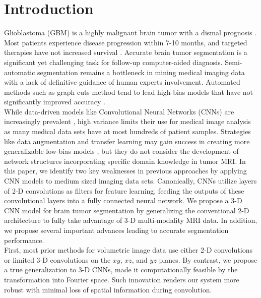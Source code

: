 \documentclass{llncs}
\begin{document}

\section{Introduction}
Glioblastoma (GBM) is a highly malignant brain tumor with a dismal prognosis \cite{Adamson09}. Most patients experience disease progression within 7-10 months, and targeted therapies have not increased survival \cite{Omuro13,Omuro07}. Accurate brain tumor segmentation is a significant yet challenging task for follow-up computer-aided diagnosis. Semi-automatic segmentation remains a bottleneck in mining medical imaging data with a lack of definitive guidance of human experts involvement. Automated methods such as graph cuts method tend to lead high-bias models that have not significantly improved accuracy \cite{Njeh15}. \\
\indent While data-driven models like Convolutional Neural Networks (CNNs) are increasingly prevalent \cite{Deng09,Krizhevsky12,Lawrence97,Wei}, high variance limits their use for medical image analysis as many medical data sets have at most hundreds of patient samples. Strategies like data augmentation and transfer learning may gain success in creating more generalizable low-bias models \cite{Cui14,Yosinski14}, but they do not consider the development of network structures incorporating specific domain knowledge in tumor MRI. In this paper, we identify two key weaknesses in previous approaches by applying CNN models to medium sized imaging data sets. Canonically, CNNs utilize layers of 2-D convolutions as filters for feature learning, feeding the outputs of these convolutional layers into a fully connected neural network. We propose a 3-D CNN model for brain tumor segmentation by generalizing the conventional 2-D architecture to fully take advantage of 3-D multi-modality MRI data. In addition, we propose several important advances leading to accurate segmentation performance. \\ 
\indent First, most prior methods for volumetric image data use either 2-D convolutions or limited 3-D convolutions on the $xy$, $xz$, and $yz$ planes. By contrast, we propose a true generalization to 3-D CNNs, made it computationally feasible by the transformation into Fourier space. Such innovation renders our system more robust with minimal loss of spatial information during convolution. \\
\end{document}
